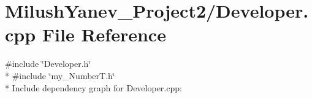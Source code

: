\section{Milush\+Yanev\+\_\+\+Project2/\+Developer.cpp File Reference}
\label{_developer_8cpp}
{\ttfamily \#include \char`\"{}Developer.\+h\char`\"{}}\\*
{\ttfamily \#include \char`\"{}my\+\_\+\+Number\+T.\+h\char`\"{}}\\*
Include dependency graph for Developer.\+cpp\+:
